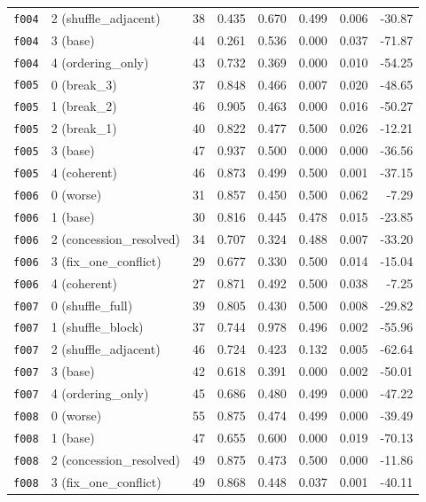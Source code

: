\documentclass[11pt]{article}
\begin{document}
\begin{table}[htbp]
\begin{tabular}{llrrrrrr}
\texttt{f004} & 2 (shuffle\_adjacent) & 38 & 0.435 & 0.670 & 0.499 & 0.006 & -30.87 \\
\texttt{f004} & 3 (base) & 44 & 0.261 & 0.536 & 0.000 & 0.037 & -71.87 \\
\texttt{f004} & 4 (ordering\_only) & 43 & 0.732 & 0.369 & 0.000 & 0.010 & -54.25 \\
\midrule
\texttt{f005} & 0 (break\_3) & 37 & 0.848 & 0.466 & 0.007 & 0.020 & -48.65 \\
\texttt{f005} & 1 (break\_2) & 46 & 0.905 & 0.463 & 0.000 & 0.016 & -50.27 \\
\texttt{f005} & 2 (break\_1) & 40 & 0.822 & 0.477 & 0.500 & 0.026 & -12.21 \\
\texttt{f005} & 3 (base) & 47 & 0.937 & 0.500 & 0.000 & 0.000 & -36.56 \\
\texttt{f005} & 4 (coherent) & 46 & 0.873 & 0.499 & 0.500 & 0.001 & -37.15 \\
\midrule
\texttt{f006} & 0 (worse) & 31 & 0.857 & 0.450 & 0.500 & 0.062 & -7.29 \\
\texttt{f006} & 1 (base) & 30 & 0.816 & 0.445 & 0.478 & 0.015 & -23.85 \\
\texttt{f006} & 2 (concession\_resolved) & 34 & 0.707 & 0.324 & 0.488 & 0.007 & -33.20 \\
\texttt{f006} & 3 (fix\_one\_conflict) & 29 & 0.677 & 0.330 & 0.500 & 0.014 & -15.04 \\
\texttt{f006} & 4 (coherent) & 27 & 0.871 & 0.492 & 0.500 & 0.038 & -7.25 \\
\midrule
\texttt{f007} & 0 (shuffle\_full) & 39 & 0.805 & 0.430 & 0.500 & 0.008 & -29.82 \\
\texttt{f007} & 1 (shuffle\_block) & 37 & 0.744 & 0.978 & 0.496 & 0.002 & -55.96 \\
\texttt{f007} & 2 (shuffle\_adjacent) & 46 & 0.724 & 0.423 & 0.132 & 0.005 & -62.64 \\
\texttt{f007} & 3 (base) & 42 & 0.618 & 0.391 & 0.000 & 0.002 & -50.01 \\
\texttt{f007} & 4 (ordering\_only) & 45 & 0.686 & 0.480 & 0.499 & 0.000 & -47.22 \\
\midrule
\texttt{f008} & 0 (worse) & 55 & 0.875 & 0.474 & 0.499 & 0.000 & -39.49 \\
\texttt{f008} & 1 (base) & 47 & 0.655 & 0.600 & 0.000 & 0.019 & -70.13 \\
\texttt{f008} & 2 (concession\_resolved) & 49 & 0.875 & 0.473 & 0.500 & 0.000 & -11.86 \\
\texttt{f008} & 3 (fix\_one\_conflict) & 49 & 0.868 & 0.448 & 0.037 & 0.001 & -40.11 \\

\end{tabular}
\end{table}
\end{document}
